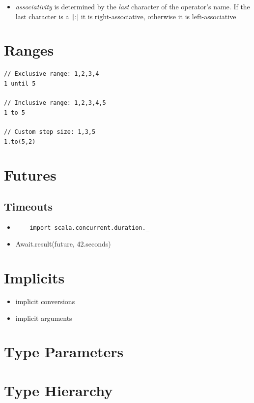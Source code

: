\documentclass[10pt,landscape,a4paper]{article}
\begin{document}
\begin{multicols*}{4}
\begin{itemize}
\begin{tabular}{l | l}
  \end{tabular}
\item \textit{associativity} is determined by the \textit{last}
  character of the operator's name.  If the last character is a
  \texttt|:| it is right-associative, otherwise it is
  left-associative
\end{itemize}

\section{Ranges}

\begin{verbatim}
// Exclusive range: 1,2,3,4
1 until 5

// Inclusive range: 1,2,3,4,5
1 to 5

// Custom step size: 1,3,5
1.to(5,2)

\end{verbatim}

\section{Futures}

\subsection{Timeouts}
\begin{itemize}
\item
  \begin{verbatim}
    import scala.concurrent.duration._
  \end{verbatim}
\item Await.result(future, 42.seconds)
\end{itemize}

\section{Implicits}
\begin{itemize}
\item implicit conversions
\item implicit arguments
\end{itemize}

\section{Type Parameters}

\section{Type Hierarchy}


\end{multicols*}
\end{document}
